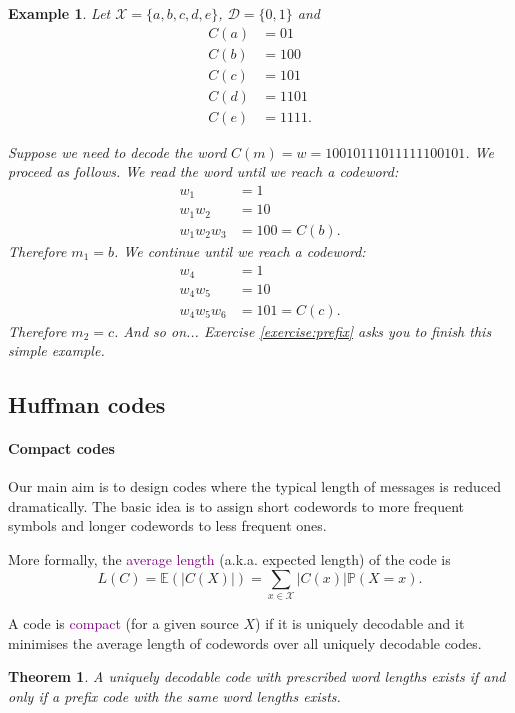 \documentclass[a4paper, 11pt]{article}
\numberwithin{equation}{section}
\theoremstyle{plain}
\newtheorem{theorem}	[equation]	{Theorem}
\newtheorem{example}	[equation]	{Example}
\theoremstyle{definition}
\newcommand{\probability}{\mathbb{P}}
\newcommand{\expectation}{\mathbb{E}}
\newcommand{\Define}[1]{\textcolor{purple}{#1}}
\begin{document}
\begin{example}
Let $\mathcal{X} = \{a, b, c, d, e\}$, $\mathcal{D} = \{0,1\}$ and 
\begin{align*}
    C(a) &= 01\\
    C(b) &= 100\\
    C(c) &= 101\\
    C(d) &= 1101\\
    C(e) &= 1111.
\end{align*}

Suppose we need to decode the word $C(m) = w = 10010111011111100101$. We proceed as follows. We read the word until we reach a codeword:
\begin{align*}
    w_1 &= 1\\
    w_1 w_2 &= 10\\
    w_1 w_2 w_3 &= 100 = C(b). 
\end{align*}
Therefore $m_1 = b$. We continue until we reach a codeword:
\begin{align*}
    w_4 &= 1\\
    w_4 w_5 &= 10\\
    w_4 w_5 w_6 &= 101 = C(c). 
\end{align*}
Therefore $m_2 = c$. And so on... Exercise \ref{exercise:prefix} asks you to finish this simple example.
\end{example}


\subsection{Huffman codes}


\paragraph{Compact codes}

Our main aim is to design codes where the typical length of messages is reduced dramatically. The basic idea is to assign short codewords to more frequent symbols and longer codewords to less frequent ones.


More formally, the \Define{average length} (a.k.a. expected length) of the code is 
\[
    L(C) = \expectation( |C(X)| ) = \sum_{x \in \mathcal{X}} |C(x)| \probability(X = x).
\]

A code is \Define{compact} (for a given source $X$) if it is uniquely decodable and it minimises the average length of codewords over all uniquely decodable codes.


\begin{theorem}
A uniquely decodable code with prescribed word lengths exists if and only if a prefix code with the same word lengths exists.
\end{theorem}
\end{document}

